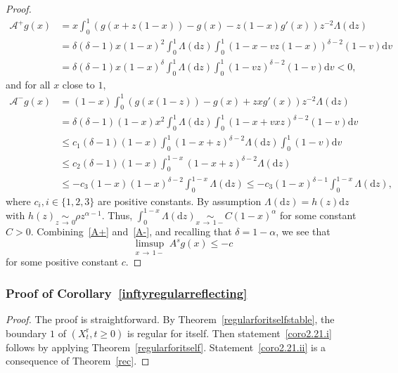 \documentclass[AHL,Unicode,longabstracts,published]{cedram}
\newcommand{\ddr}{\mathrm{d}}
\newcommand{\rmr}{\mathrm{r}}
\newcommand{\clA}{\mathcal{A}}
\begin{document}
\begin{proof}
\begin{equation}\label{A+}
\begin{split}
\clA^{+}g(x)&=x\int_0^1 (g(x+z(1-x))-g(x)-z(1-x) g'(x))z^{-2}\Lambda(\ddr z) \\
&=\delta(\delta-1)x(1-x)^2\int_0^1 \Lambda(\ddr z)\int_0^1(1-x-vz(1-x))^{\delta-2}(1-v)\ddr v\\
&=\delta(\delta-1)x(1-x)^\delta\int_0^1\Lambda(\ddr z)\int_0^1(1-vz)^{\delta-2}(1-v)\ddr v<0,
\end{split}
\end{equation}
and for all $x$ close to $1$,
\begin{equation}\label{A-}
\begin{split}
\clA^{-}g(x)&=(1-x)\int_0^1(g(x(1-z))-g(x)+zxg'(x))z^{-2}\Lambda(\ddr z) \\
&=\delta(\delta-1)(1-x)x^2\int_0^1 \Lambda(\ddr z)\int_0^1 (1-x+vxz)^{\delta-2}(1-v)\ddr v\\
&\leq c_1(\delta-1)(1-x)\int_0^1 (1-x+z)^{\delta-2} \Lambda(\ddr z)\int_0^1(1-v)\ddr v \\
&\leq c_2(\delta-1)(1-x)\int_0^{1-x} (1-x+z)^{\delta-2} \Lambda(\ddr z) \\
&\leq -c_3(1-x)(1-x)^{\delta-2}\int_0^{1-x}\Lambda(\ddr z) \leq -c_3(1-x)^{\delta-1}\int_0^{1-x}\Lambda(\ddr z),
\end{split}
\end{equation}
where $c_i, i\in \{1,2,3\}$ are positive constants. By assumption $\Lambda(\ddr z)=h(z)\ddr z$ with $h(z)\underset{z\,\rightarrow\,0}{\sim} \rho z^{\alpha-1}$. Thus, $\int_0^{1-x}\Lambda(\ddr z)\underset{x\,\rightarrow\,1-}{\sim} C(1-x)^{\alpha}$ for some constant $C>0$. Combining~\eqref{A+} and~\eqref{A-}, and recalling that $\delta=1-\alpha$, we see that
\[
\underset{x\,\rightarrow\,1-}{\limsup}\ A^sg(x)\leq -c
\] 
for some positive constant $c$.
\end{proof}


\subsubsection{Proof of Corollary~\ref{inftyregularreflecting}}
\begin{proof}
The proof is straightforward. By Theorem~\ref{regularforitselfstable}, the boundary $1$ of $(X_t^{\rmr},t\geq 0)$ is regular for itself. Then statement~\eqref{coro2.21.i} follows by applying Theorem~\ref{regularforitself}. Statement~\eqref{coro2.21.ii} is a consequence of Theorem~\ref{rec}. 
\end{proof}
\end{document}

